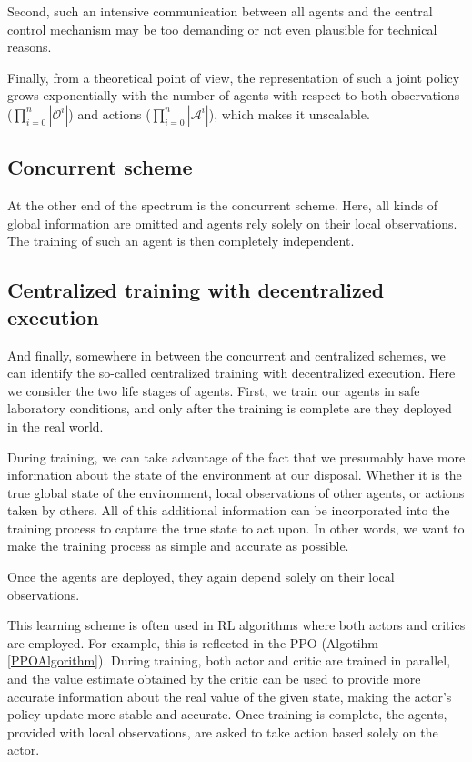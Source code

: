 Second, such an intensive communication between all agents and the central control mechanism may be too demanding or not even plausible for technical reasons.

Finally, from a theoretical point of view, the representation of such a joint policy grows exponentially with the number of agents with respect to both observations ($\prod_{i=0}^{n}{|\mathcal{O}^i|}$) and actions ($\prod_{i=0}^{n}|\mathcal{A}^i|$), which makes it unscalable.

\subsection*{Concurrent scheme}
At the other end of the spectrum is the concurrent scheme.
Here, all kinds of global information are omitted and agents rely solely on their local observations.
The training of such an agent is then completely independent.

\subsection*{Centralized training with decentralized execution}
And finally, somewhere in between the concurrent and centralized schemes, we can identify the so-called centralized training with decentralized execution.
Here we consider the two life stages of agents. 
First, we train our agents in safe laboratory conditions, and only after the training is complete are they deployed in the real world.

During training, we can take advantage of the fact that we presumably have more information about the state of the environment at our disposal.
Whether it is the true global state of the environment, local observations of other agents, or actions taken by others.
All of this additional information can be incorporated into the training process to capture the true state to act upon.
In other words, we want to make the training process as simple and accurate as possible.

Once the agents are deployed, they again depend solely on their local observations.

This learning scheme is often used in RL algorithms where both actors and critics are employed.
For example, this is reflected in the PPO (Algotihm \ref{PPOAlgorithm}).
During training, both actor and critic are trained in parallel, and the value estimate obtained by the critic can be used to provide more accurate information about the real value of the given state, making the actor's policy update more stable and accurate.
Once training is complete, the agents, provided with local observations, are asked to take action based solely on the actor.

